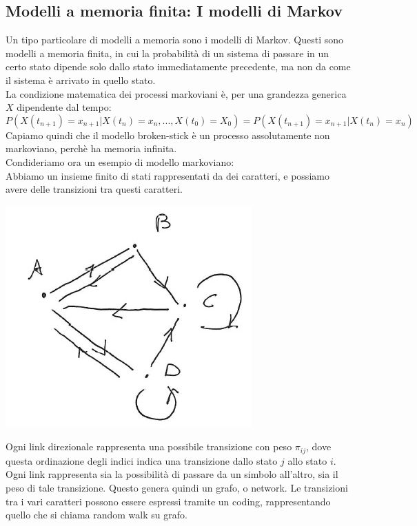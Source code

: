 \documentclass[12pt]{article}
\begin{document}
\subsection{Modelli a memoria finita: I modelli di Markov}
Un tipo particolare di modelli a memoria sono i modelli di Markov. Questi sono modelli a memoria finita, in cui la probabilità di un sistema di passare in un certo stato dipende solo dallo stato immediatamente precedente, ma non da come il sistema è arrivato in quello stato. \\
La condizione matematica dei processi markoviani è, per una grandezza generica $X$ dipendente dal tempo:
\begin{equation}
	P(X(t_{n+1})=x_{n+1}|X(t_n)=x_n, ..., X(t_0)=X_0) = P(X(t_{n+1})=x_{n+1}|X(t_n)=x_n)
\end{equation}
Capiamo quindi che il modello broken-stick è un processo assolutamente non markoviano, perchè ha memoria infinita. \\
Condideriamo ora un esempio di modello markoviano:\\
Abbiamo un insieme finito di stati rappresentati da dei caratteri, e possiamo avere delle transizioni tra questi caratteri.
\begin{center}
	\includegraphics[scale=.85]{Grafo processo non markoviano}
\end{center}
Ogni link direzionale rappresenta una possibile transizione con peso $\pi_{ij}$, dove questa ordinazione degli indici indica una transizione dallo stato $j$ allo stato $i$. Ogni link rappresenta sia la possibilità di passare da un simbolo all'altro, sia il peso di tale transizione. Questo genera quindi un grafo, o network. Le transizioni tra i vari caratteri possono essere espressi tramite un coding, rappresentando quello che si chiama random walk su grafo. \\
\end{document}

